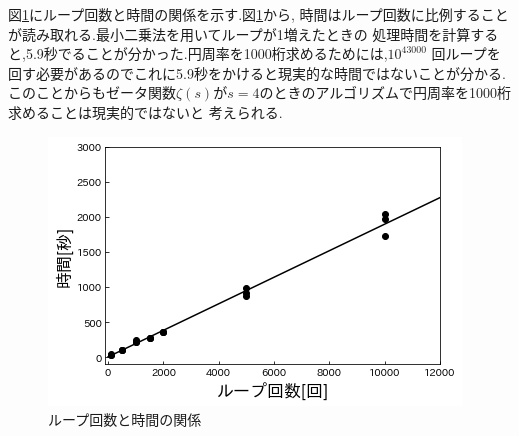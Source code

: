 \documentclass[a4j] {jarticle}
\begin{document}
      図\ref{loop_time}にループ回数と時間の関係を示す.図\ref{loop_time}から,
      時間はループ回数に比例することが読み取れる.最小二乗法を用いてループが1増えたときの
      処理時間を計算すると,5.9秒でることが分かった.円周率を1000桁求めるためには,$10^{43000}$
      回ループを回す必要があるのでこれに5.9秒をかけると現実的な時間ではないことが分かる.
      このことからもゼータ関数$\zeta(s)$が$s=4$のときのアルゴリズムで円周率を1000桁求めることは現実的ではないと
    考えられる.
      \begin{figure}[H]
        \centering
        \includegraphics[scale=0.6]{loop_time.png}
        \caption{ループ回数と時間の関係}
       \label{loop_time}
      \end{figure}
\end{document}
